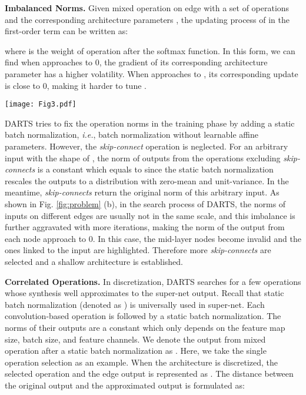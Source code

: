 \documentclass[journal]{IEEEtran}
\begin{document}
\textbf{Imbalanced Norms.} Given mixed operation  on edge  with a set of operations  and the corresponding architecture parameters , the updating process of  in the first-order term can be written as:


where  is the weight of operation  after the softmax function. In this form, we can find when  approaches to 0, the gradient of its corresponding architecture parameter has a higher volatility. When  approaches to , its corresponding update is close to 0, making it harder to tune .

\begin{figure*}[!htb]
\begin{center}
\end{center}
	\texttt{[image: Fig3.pdf]}
   \caption{Visualization of the imbalance of nodes and the correlation between operations in a cell of DARTS: (a) the dense connection within a single cell; (b) the curves of norms of the nodes in training (normalized by the norm of Node ); and (c) the correlation matrix between operations of Node  before discretization.}
\label{fig:problem}
\end{figure*} 

DARTS tries to fix the operation norms in the training phase by adding a static batch normalization, \emph{i.e.}, batch normalization without learnable affine parameters. However, the \textit{skip-connect} operation is neglected. For an arbitrary input  with the shape of , the norm of outputs from the operations excluding \textit{skip-connects} is a constant  which equals to  since the static batch normalization rescales the outputs to a distribution with zero-mean and unit-variance. In the meantime, \textit{skip-connects} return the original norm of this arbitrary input. As shown in Fig. \ref{fig:problem} (b), in the search process of DARTS, the norms of inputs on different edges are usually not in the same scale, and this imbalance is further aggravated with more iterations, making the norm of the output from each node approach to 0. In this case, the mid-layer nodes become invalid and the ones linked to the input are highlighted. Therefore more \textit{skip-connects} are selected and a shallow architecture is established.


\label{Correlation}
\textbf{Correlated Operations.} In discretization, DARTS searches for a few operations whose synthesis well approximates to the super-net output. Recall that static batch normalization (denoted as ) is universally used in super-net. Each convolution-based operation is followed by a static batch normalization. The norms of their outputs are a constant  which only depends on the feature map size, batch size, and feature channels. We denote the output  from mixed operation  after a static batch normalization as . Here, we take the single operation selection as an example. When the architecture is discretized, the selected operation  and the edge output  is represented as . The distance between the original output  and the approximated output  is formulated as:
\end{document}
